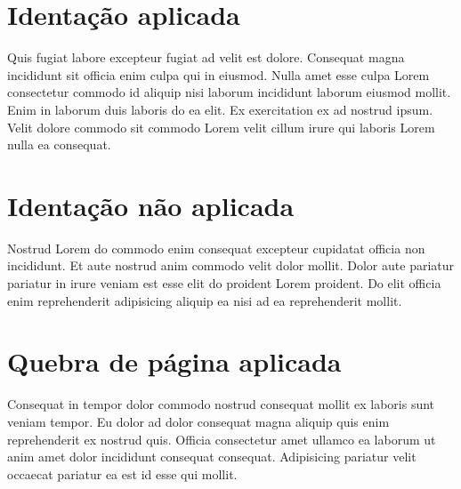 \documentclass{article}
\begin{document}
\section{Identação aplicada}

Quis fugiat labore excepteur fugiat ad velit est dolore. Consequat magna incididunt sit officia enim culpa qui in eiusmod. Nulla amet esse culpa Lorem consectetur commodo id aliquip nisi laborum incididunt laborum eiusmod mollit. Enim in laborum duis laboris do ea elit. Ex exercitation ex ad nostrud ipsum. Velit dolore commodo sit commodo Lorem velit cillum irure qui laboris Lorem nulla ea consequat.

\section{Identação não aplicada}

\noindent Nostrud Lorem do commodo enim consequat excepteur cupidatat officia non incididunt. Et aute nostrud anim commodo velit dolor mollit. Dolor aute pariatur pariatur in irure veniam est esse elit do proident Lorem proident. Do elit officia enim reprehenderit adipisicing aliquip ea nisi ad ea reprehenderit mollit.

\newpage

\section{Quebra de página aplicada}

Consequat in tempor dolor commodo nostrud consequat mollit ex laboris sunt veniam tempor. Eu dolor ad dolor consequat magna aliquip quis enim reprehenderit ex nostrud quis. Officia consectetur amet ullamco ea laborum ut anim amet dolor incididunt consequat consequat. Adipisicing pariatur velit occaecat pariatur ea est id esse qui mollit.
\end{document}
